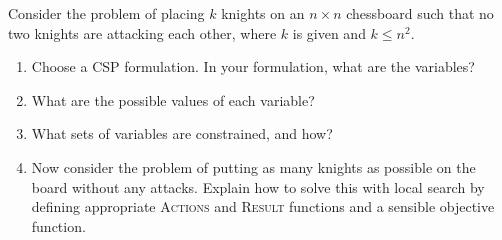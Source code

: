 \documentclass[cn,12pt]{homework}
\begin{document}
\begin{problem}


Consider the problem of placing $k$ knights on an $n \times n$ chessboard such that no two knights are attacking each other, where $k$ is given and $k \leq n^2$.

\begin{enumerate}
    \item[a.] Choose a CSP formulation. In your formulation, what are the variables?
    \item[b.] What are the possible values of each variable?
    \item[c.] What sets of variables are constrained, and how?
    \item[d.] Now consider the problem of putting as many knights as possible on the board without any attacks. Explain how to solve this with local search by defining appropriate \textsc{Actions} and \textsc{Result} functions and a sensible objective function.
\end{enumerate}




\end{problem}
\end{document}
